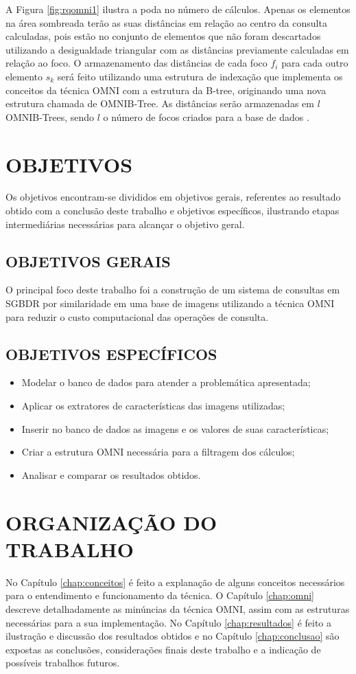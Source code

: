 A Figura \ref{fig:rqomni1} ilustra a poda no número de cálculos. Apenas os elementos na área sombreada terão as suas distâncias em relação ao centro da consulta calculadas, pois estão no
conjunto de elementos que não foram descartados utilizando a desigualdade triangular com as distâncias previamente calculadas em relação ao foco. O armazenamento das distâncias de cada foco ${f_i}$ para cada outro elemento $s_k$ será feito 
utilizando uma estrutura de indexação que implementa os conceitos da técnica OMNI com a estrutura da B-tree, originando uma nova estrutura chamada de OMNIB-Tree. As distâncias serão armazenadas em $l$ OMNIB-Trees, sendo $l$ o número de focos
criados para a base de dados \cite{Traina2001}.

\section{OBJETIVOS}
\label{sec:objetivos}
Os objetivos encontram-se divididos em objetivos gerais, referentes ao resultado obtido com a conclusão deste trabalho e objetivos específicos, ilustrando etapas intermediárias necessárias para alcançar o objetivo geral.
\subsection{OBJETIVOS GERAIS}
\label{subsec:objger}
O principal foco deste trabalho foi a construção de um sistema de consultas em SGBDR por similaridade em uma base de imagens utilizando a técnica OMNI para reduzir o custo computacional das operações de consulta.

\subsection{OBJETIVOS ESPECÍFICOS}
\label{subsec:objesp}
\begin{itemize}
 \item Modelar o banco de dados para atender a problemática apresentada;
 \item Aplicar os extratores de características das imagens utilizadas;
 \item Inserir no banco de dados as imagens e os valores de suas características;
 \item Criar a estrutura OMNI necessária para a filtragem dos cálculos;
 \item Analisar e comparar os resultados obtidos.
\end{itemize}


\section{ORGANIZAÇÃO DO TRABALHO}
\label{sec:organizacaoTrabalho}

No Capítulo \ref{chap:conceitos} é feito a explanação de alguns conceitos necessários para o entendimento e funcionamento da técnica. O Capítulo
\ref{chap:omni} descreve detalhadamente as minúncias da técnica OMNI, assim com as estruturas necessárias para a sua implementação. No Capítulo
\ref{chap:resultados} é feito a ilustração e discussão dos resultados obtidos e no Capítulo \ref{chap:conclusao} são expostas as conclusões, considerações
finais deste trabalho e a indicação de possíveis trabalhos futuros.